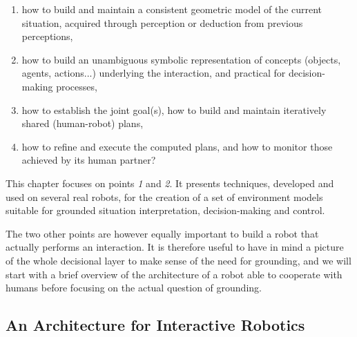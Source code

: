\documentclass{svmult}
\begin{document}
\begin{enumerate}

	\item how to build and maintain a consistent geometric model of the current
	situation, acquired through perception or deduction from previous
	perceptions,

	\item how to build an unambiguous symbolic representation of concepts
	(objects, agents, actions...) underlying the interaction, and practical for
	decision-making processes,

	\item how to establish the joint goal(s), how to build and maintain
	iteratively shared (human-robot) plans, 

	\item how to refine and execute the computed plans, and how to monitor
	those achieved by its human partner?

\end{enumerate}


This chapter focuses on points {\it 1} and {\it 2}. It presents techniques,
developed and used on several real robots, for the creation of a set of
environment models suitable for grounded situation interpretation,
decision-making and control.

The two other points are however equally important to build a robot that
actually performs an interaction. It is therefore useful to have in mind a
picture of the whole decisional layer to make sense of the need for grounding,
and we will start with a brief overview of the architecture of a robot able to
cooperate with humans before focusing on the actual question of grounding.


\subsection{An Architecture for Interactive Robotics}
 
\end{document}
